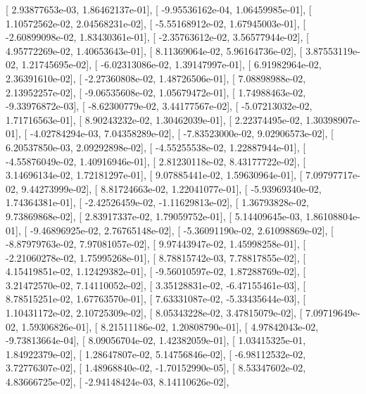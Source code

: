 \documentclass{article}
\begin{document}
       [  2.93877653e-03,   1.86462137e-01],
       [ -9.95536162e-04,   1.06459985e-01],
       [  1.10572562e-02,   2.04568231e-02],
       [ -5.55168912e-02,   1.67945003e-01],
       [ -2.60899098e-02,   1.83430361e-01],
       [ -2.35763612e-02,   3.56577944e-02],
       [  4.95772269e-02,   1.40653643e-01],
       [  8.11369064e-02,   5.96164736e-02],
       [  3.87553119e-02,   1.21745695e-02],
       [ -6.02313086e-02,   1.39147997e-01],
       [  6.91982964e-02,   2.36391610e-02],
       [ -2.27360808e-02,   1.48726506e-01],
       [  7.08898988e-02,   2.13952257e-02],
       [ -9.06535608e-02,   1.05679472e-01],
       [  1.74988463e-02,  -9.33976872e-03],
       [ -8.62300779e-02,   3.44177567e-02],
       [ -5.07213032e-02,   1.71716563e-01],
       [  8.90243232e-02,   1.30462039e-01],
       [  2.22374495e-02,   1.30398907e-01],
       [ -4.02784294e-03,   7.04358289e-02],
       [ -7.83523000e-02,   9.02906573e-02],
       [  6.20537850e-03,   2.09292898e-02],
       [ -4.55255538e-02,   1.22887944e-01],
       [ -4.55876049e-02,   1.40916946e-01],
       [  2.81230118e-02,   8.43177722e-02],
       [  3.14696134e-02,   1.72181297e-01],
       [  9.07885441e-02,   1.59630964e-01],
       [  7.09797717e-02,   9.44273999e-02],
       [  8.81724663e-02,   1.22041077e-01],
       [ -5.93969340e-02,   1.74364381e-01],
       [ -2.42526459e-02,  -1.11629813e-02],
       [  1.36793828e-02,   9.73869868e-02],
       [  2.83917337e-02,   1.79059752e-01],
       [  5.14409645e-03,   1.86108804e-01],
       [ -9.46896925e-02,   2.76765148e-02],
       [ -5.36091190e-02,   2.61098869e-02],
       [ -8.87979763e-02,   7.97081057e-02],
       [  9.97443947e-02,   1.45998258e-01],
       [ -2.21060278e-02,   1.75995268e-01],
       [  8.78815742e-03,   7.78817855e-02],
       [  4.15419851e-02,   1.12429382e-01],
       [ -9.56010597e-02,   1.87288769e-02],
       [  3.21472570e-02,   7.14110052e-02],
       [  3.35128831e-02,  -6.47155461e-03],
       [  8.78515251e-02,   1.67763570e-01],
       [  7.63331087e-02,  -5.33435644e-03],
       [  1.10431172e-02,   2.10725309e-02],
       [  8.05343228e-02,   3.47815079e-02],
       [  7.09719649e-02,   1.59306826e-01],
       [  8.21511186e-02,   1.20808790e-01],
       [  4.97842043e-02,  -9.73813664e-04],
       [  8.09056704e-02,   1.42382059e-01],
       [  1.03415325e-01,   1.84922379e-02],
       [  1.28647807e-02,   5.14756846e-02],
       [ -6.98112532e-02,   3.72776307e-02],
       [  1.48968840e-02,  -1.70152990e-05],
       [  8.53347602e-02,   4.83666725e-02],
       [ -2.94148424e-03,   8.14110626e-02],
\end{document}
